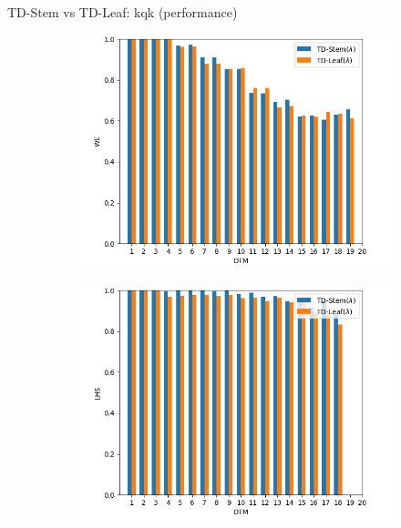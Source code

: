 \documentclass{beamer}
\begin{document}
\begin{frame}{TD-Stem vs TD-Leaf: kqk (performance)}
\begin{figure}
\begin{subfigure}{0.4\textwidth}
			\includegraphics[scale=0.25]{fig/plots/kqk_we}
		\end{subfigure}
		\begin{subfigure}{0.4\textwidth}
			\includegraphics[scale=0.25]{fig/plots/kqk_lhs}
		\end{subfigure}
	\end{figure}
\end{frame}
\end{document}
